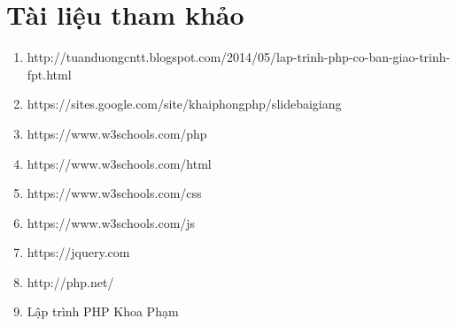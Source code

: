 \documentclass[12pt,a4paper]{article}
\begin{document}
      
\newpage
\section{Tài liệu tham khảo}
\begin{enumerate}
\item http://tuanduongcntt.blogspot.com/2014/05/lap-trinh-php-co-ban-giao-trinh-fpt.html
\item https://sites.google.com/site/khaiphongphp/slidebaigiang
\item https://www.w3schools.com/php
\item https://www.w3schools.com/html
\item https://www.w3schools.com/css
\item https://www.w3schools.com/js
\item https://jquery.com
\item http://php.net/
\item Lập trình PHP Khoa Phạm
\end{enumerate}    
\end{document}
